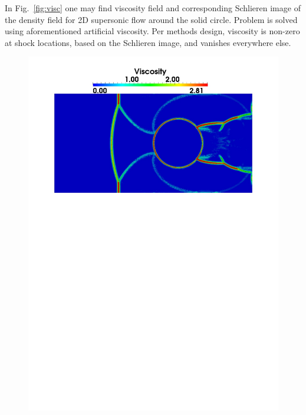 In Fig.~\ref{fig:visc} one may find viscosity field and corresponding Schlieren image of the density field for 2D supersonic flow around the solid circle. Problem is solved using aforementioned artificial viscosity. Per methods design, viscosity is non-zero at shock locations, based on the Schlieren image, and vanishes everywhere else.
\begin{figure}[h!]
\begin{minipage}{0.5\linewidth}
\includegraphics[scale=0.4]{fig/visc.pdf}\\
\end{minipage}
\begin{minipage}{0.5\linewidth}

\end{minipage}
\end{figure}
